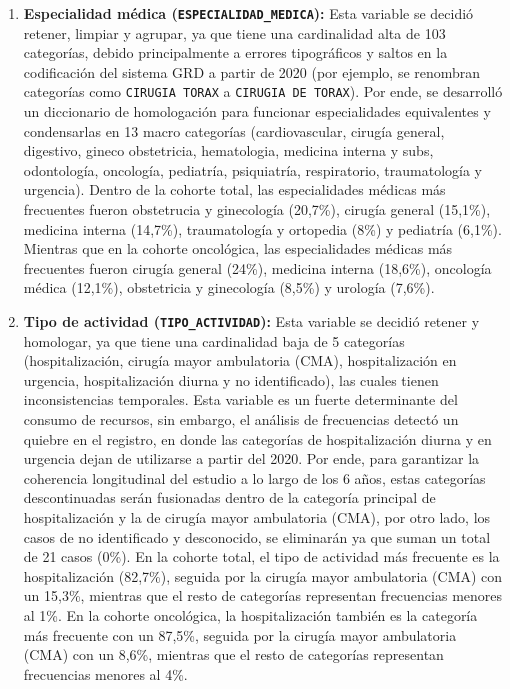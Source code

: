 \begin{enumerate}
    \item \textbf{Especialidad médica (\texttt{ESPECIALIDAD\_MEDICA}):} Esta variable se decidió retener, limpiar y agrupar, ya que tiene una cardinalidad alta de 103 categorías, debido principalmente a errores tipográficos y saltos en la codificación del sistema GRD a partir de 2020 (por ejemplo, se renombran categorías como \texttt{CIRUGIA TORAX} a \texttt{CIRUGIA DE TORAX}). Por ende, se desarrolló un diccionario de homologación para funcionar especialidades equivalentes y condensarlas en 13 macro categorías (cardiovascular, cirugía general, digestivo, gineco obstetricia, hematologia, medicina interna y subs, odontología, oncología, pediatría, psiquiatría, respiratorio, traumatología y urgencia). Dentro de la cohorte total, las especialidades médicas más frecuentes fueron obstetrucia y ginecología (20,7\%), cirugía general (15,1\%), medicina interna (14,7\%), traumatología y ortopedia (8\%) y pediatría (6,1\%). Mientras que en la cohorte oncológica, las especialidades médicas más frecuentes fueron cirugía general (24\%), medicina interna (18,6\%), oncología médica (12,1\%), obstetricia y ginecología (8,5\%) y urología (7,6\%).
    \item \textbf{Tipo de actividad (\texttt{TIPO\_ACTIVIDAD}):} Esta variable se decidió retener y homologar, ya que tiene una cardinalidad baja de 5 categorías (hospitalización, cirugía mayor ambulatoria (CMA), hospitalización en urgencia, hospitalización diurna y no identificado), las cuales tienen inconsistencias temporales. Esta variable es un fuerte determinante del consumo de recursos, sin embargo, el análisis de frecuencias detectó un quiebre en el registro, en donde las categorías de hospitalización diurna y en urgencia dejan de utilizarse a partir del 2020. Por ende, para garantizar la coherencia longitudinal del estudio a lo largo de los 6 años, estas categorías descontinuadas serán fusionadas dentro de la categoría principal de hospitalización y la de cirugía mayor ambulatoria (CMA), por otro lado, los casos de no identificado y desconocido, se eliminarán ya que suman un total de 21 casos (0\%). En la cohorte total, el tipo de actividad más frecuente es la hospitalización (82,7\%), seguida por la cirugía mayor ambulatoria (CMA) con un 15,3\%, mientras que el resto de categorías representan frecuencias menores al 1\%. En la cohorte oncológica, la hospitalización también es la categoría más frecuente con un 87,5\%, seguida por la cirugía mayor ambulatoria (CMA) con un 8,6\%, mientras que el resto de categorías representan frecuencias menores al 4\%.

\end{enumerate}
